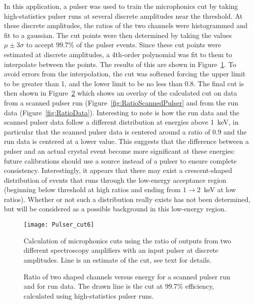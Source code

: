 	In this application, a pulser was used to train the microphonics cut by taking high-statistics pulser runs at several discrete amplitudes near the threshold.  At these discrete amplitudes, the ratios of the two channels were histogrammed and fit to a gaussian.  The cut points were then determined by taking the values $\mu \pm 3 \sigma$ to accept 99.7\% of the pulser events.  Since these cut points were estimated at discrete amplitudes, a 4th-order polynomial was fit to them to interpolate between the points.  The results of this are shown in Figure~\ref{fig:RatioOfShapedChannels}.  To avoid errors from the interpolation, the cut was softened forcing the upper limit to be greater than 1, and the lower limit to be no less than 0.8.  The final cut is then shown in Figure~\ref{fig:RatioOfShapedChannelsFinal} which shows an overlay of the calculated cut on data from a scanned pulser run (Figure~\ref{fig:RatioScannedPulser} and from the run data (Figure~\ref{fig:RatioData}).  Interesting to note is how the run data and the scanned pulser data follow a different distribution at energies above 1~keV, in particular that the scanned pulser data is centered around a ratio of 0.9 and the run data is centered at a lower value.  This suggests that the difference between a pulser and an actual crystal event become more significant at these energies: future calibrations should use a source instead of a pulser to ensure complete consistency.  Interestingly, it appears that there may exist a crescent-shaped distribution of events that runs through the low-energy acceptance region (beginning below threshold at high ratios and ending from $1\to2$~keV at low ratios).  Whether or not such a distribution really exists has not been determined, but will be considered as a possible background in this low-energy region.  

			\begin{figure}
				\centering
				\texttt{[image: Pulser\_cut6]}
				\caption[Calculation of microphonics cuts]
				{Calculation of microphonics cuts using the ratio of outputs from two different spectroscopy amplifiers with an 
				input pulser at discrete amplitudes.  Line is 
				an estimate of the cut, see text for details.  }
				\label{fig:RatioOfShapedChannels}
			\end{figure}

			\begin{figure}
				\centering
				\caption[Microphonics cuts on data and scanned pulser runs]
				{Ratio of two shaped channels versus energy for a scanned pulser run and for run data.  The drawn line is the cut at 99.7\% efficiency, calculated using
				high-statistics pulser runs.}
				\label{fig:RatioOfShapedChannelsFinal}
			\end{figure}
	

